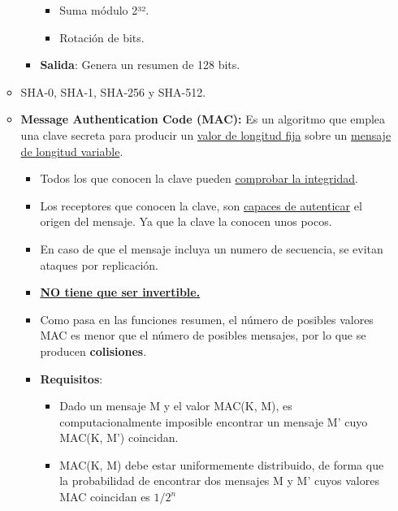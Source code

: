 \documentclass[12pt, twoside, openright]{report} %
\begin{document}
\begin{itemize}
\begin{itemize}
\begin{itemize}
\begin{itemize}
        \item Suma módulo 2³².
          
        \item Rotación de bits.
          
        \end{itemize}
      \item \textbf{Salida}: Genera un resumen de 128 bits.
        
      \end{itemize}
    \item SHA-0, SHA-1, SHA-256 y SHA-512.
      
    \item \textbf{Message Authentication Code (MAC):} Es un algoritmo que
      emplea una clave secreta para producir un \underline{valor de
      longitud fija} sobre un \underline{mensaje de longitud variable}.
      

      \begin{itemize}
      \item Todos los que conocen la clave pueden \underline{comprobar la
        integridad}.
        
      \item Los receptores que conocen la clave, son \underline{capaces de
        autenticar} el origen del mensaje. Ya que la clave la conocen
        unos pocos.
        
      \item En caso de que el mensaje incluya un numero de secuencia, se
        evitan ataques por replicación.
        
      \item \textbf{\underline{NO tiene que ser invertible.}}
        
      \item Como pasa en las funciones resumen, el número de posibles
        valores MAC es menor que el número de posibles mensajes, por lo
        que se producen \textbf{colisiones}.
        
      \item \textbf{Requisitos}:
        

        \begin{itemize}
        \item Dado un mensaje M y el valor MAC(K, M), es computacionalmente
          imposible encontrar un mensaje M' cuyo MAC(K, M') coincidan.
          
        \item MAC(K, M) debe estar uniformemente distribuido, de forma que la
          probabilidad de encontrar dos mensajes M y M' cuyos valores
          MAC coincidan es $1/2^n$
          

\end{itemize}
\end{itemize}
\end{itemize}
\end{itemize}
\end{document}
